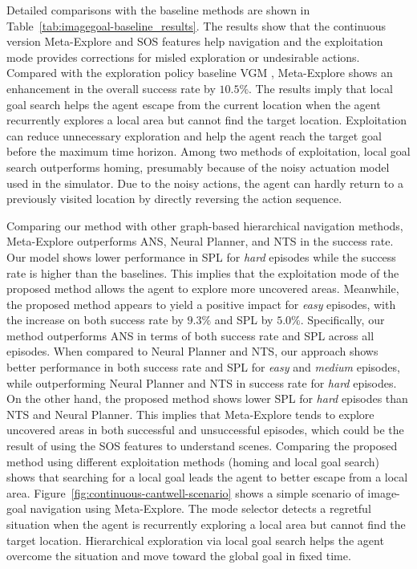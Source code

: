 \documentclass[10pt,twocolumn,letterpaper]{article}
\begin{document}
Detailed comparisons with the baseline methods are shown in Table~\ref{tab:imagegoal-baseline_results}. The results show that the continuous version Meta-Explore and SOS features help navigation and the exploitation mode provides corrections for misled exploration or undesirable actions. Compared with the exploration policy baseline VGM \cite{vgm}, Meta-Explore shows an enhancement in the overall success rate by $10.5\%$. The results imply that local goal search helps the agent escape from the current location when the agent recurrently explores a local area but cannot find the target location. Exploitation can reduce unnecessary exploration and help the agent reach the target goal before the maximum time horizon. Among two methods of exploitation, local goal search outperforms homing, presumably because of the noisy actuation model used in the simulator. Due to the noisy actions, the agent can hardly return to a previously visited location by directly reversing the action sequence.

Comparing our method with other graph-based hierarchical navigation methods, Meta-Explore outperforms ANS, Neural Planner, and NTS in the success rate. Our model shows lower performance in SPL for \textit{hard} episodes while the success rate is higher than the baselines. This implies that the exploitation mode of the proposed method allows the agent to explore more uncovered areas. Meanwhile, the proposed method appears to yield a positive impact for \textit{easy} episodes, with the increase on both success rate by $9.3\%$ and SPL by $5.0\%$. Specifically, our method outperforms ANS in terms of both success rate and SPL across all episodes. When compared to Neural Planner and NTS, our approach shows better performance in both success rate and SPL for \textit{easy} and \textit{medium} episodes, while outperforming Neural Planner and NTS in success rate for \textit{hard} episodes.
On the other hand, the proposed method shows lower SPL for \textit{hard} episodes than NTS and Neural Planner. This implies that Meta-Explore tends to explore uncovered areas in both successful and unsuccessful episodes, which could be the result of using the SOS features to understand scenes. Comparing the proposed method using different exploitation methods (homing and local goal search) shows that searching for a local goal leads the agent to better escape from a local area. Figure~\ref{fig:continuous-cantwell-scenario} shows a simple scenario of image-goal navigation using Meta-Explore. The mode selector detects a regretful situation when the agent is recurrently exploring a local area but cannot find the target location. Hierarchical exploration via local goal search helps the agent overcome the situation and move toward the global goal in fixed time.
\end{document}
